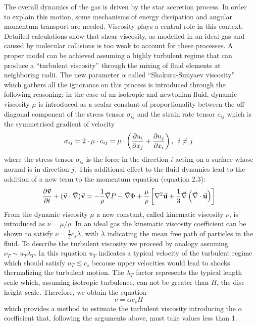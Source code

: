 \documentclass[a4paper,10pt]{report}
\begin{document}
The overall dynamics of the gas is driven by the star accretion process. In order to explain this motion, some mechanisms of energy dissipation and angular momentum transport
are needed. Viscosity plays a central role in this context. Detailed calculations show that shear viscosity, 
as modelled in an ideal gas and caused by molecular collisions is too weak to account for these processes. 
A proper model can be achieved assuming a highly turbulent regime that can produce a ``turbulent viscosity'' through the mixing of fluid elements
at neighboring radii. The new parameter $\alpha$
called ``Shakura-Sunyaev viscosity'' \citep{ssviscosity} which gathers all the ignorance on this process is introduced through the following reasoning:
in the case of an isotropic and newtonian fluid, dynamic viscosity $\mu$ is introduced as a scalar constant of 
proportionality between the off-diagonal component of the stress tensor $\sigma_{ij}$ and the strain rate tensor $e_{ij}$ which is the symmetrised gradient of velocity \citep{fluid}
\begin{equation}
    \sigma_{ij} = 2 \cdot \mu \cdot e_{ij} = \mu \cdot \left( \pdv{u_i}{x_j} + \pdv{u_j}{x_i} \right), \hspace{5pt} i \neq j
\end{equation}
where the stress tensor $\sigma_{ij}$ is the force in the direction $i$ acting on a surface whose
normal is in direction $j$.
This additional effect to the fluid dynamics lead to the addition of a new term to the momentum equation (equation 2.3):
\begin{equation}
    \pdv{\va{v}}{t} + (\va{v}\cdot \va\nabla)\va{v} = -\frac{1}{\rho}\va  \nabla P - \va \nabla \Phi + \frac{\mu}{\rho}
    \left[ \nabla^2\va u + \frac 1 3 \va \nabla \left( \va \nabla \cdot \va u\right) \right]
\end{equation}
From the dynamic viscosity $\mu$ a new constant, called kinematic viscosity $\nu$, is introduced as $\nu=\mu/\rho$.
In an ideal gas the kinematic viscosity coefficient can be shown to satisfy $\nu = \frac{1}{3}c_s\lambda$,
with $\lambda$ indicating the mean free path of particles in the fluid.
To describe the turbulent viscosity we proceed by analogy assuming $\nu_T \sim u_T \lambda_T$. In this equation $u_T$ indicates a typical velocity of the turbulent regime
which should 
satisfy $u_T \lesssim c_s$ because upper velocities would lead to shocks thermalizing the turbulent motion.
The $\lambda_T$ factor 
represents the typical length scale which, assuming isotropic turbulence, can not be greater than $H$, the disc height scale.
Therefore, we obtain the equation
\begin{equation}
    \nu = \alpha c_s H
\end{equation}
which provides a method to estimate the turbulent viscosity introducing the $\alpha$ coefficient that, following the arguments above,
must take values less than 1.
\end{document}
